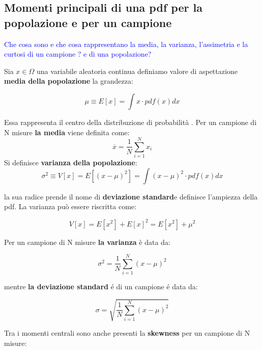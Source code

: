 \subsection{Momenti principali di una pdf per la popolazione e per un campione}

\textcolor{blue}{Che cosa sono e che cosa rappresentano la media, la varianza, l'assimetria e la curtosi di un campione ? e di una popolazione?} \newline

Sia $x \in \Omega $ una variabile aleatoria continua definiamo valore di aspettazione \textbf{media della popolazione} la grandezza:

\begin{equation}
	\mu \equiv E[x] = \int{x \cdot pdf(x)dx}
\end{equation}


\noindent Essa rappresenta il centro della distribuzione di probabilit\`{a} .\newline 
Per un campione di N  misure \textbf{la media} viene definita come: 
\begin{equation}
	\overline{x} = \dfrac{1}{N}\sum_{i=1}^Nx_{i}
\end{equation}
Si definisce \textbf{varianza della popolazione}:
\begin{equation}
	\sigma^2 \equiv V[x] = E[(x-\mu)^2] = \int{(x-\mu)^2 \cdot pdf(x)dx} 	
\end{equation}

la sua radice prende il nome di \textbf{deviazione standard}e definisce l'ampiezza della pdf. La varianza pu\`{o} essere riscritta come:

\begin{equation}
	V[x] = E[x^2] + E[x]^2 = E[x^2] + \mu^2
\end{equation}

Per un campione di N misure \textbf{la varianza} \`{e} data da:

\begin{equation}
	\sigma^2 = \dfrac{1}{N}\sum_{i=1}^N(x- \mu)^2
\end{equation}

mentre \textbf{la deviazione standard} \'{e} di un campione \'{e} data da:

\begin{equation}
	\sigma = \sqrt{\dfrac{1}{N}\sum_{i=1}^N(x- \mu)^2}
\end{equation}

Tra i momenti centrali sono anche presenti la \textbf{skewness} per un campione di N misure:

